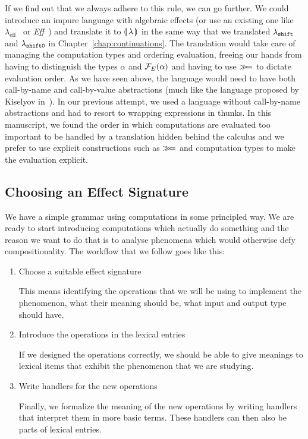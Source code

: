 If we find out that we always adhere to this rule, we can go further. We
could introduce an impure language with algebraic effects (or use an
existing one like $\lambda_{\mathrm{eff}}$~\cite{kammar2013handlers} or
\emph{Eff}~\cite{bauer2012programming}) and translate it to
$\llparenthesis \, \lambda \, \rrparenthesis$ in the same way that we translated $\lambda_{\mathtt{shift}}$ and
$\lambda_{\mathtt{shift0}}$ in Chapter~\ref{chap:continuations}. The translation
would take care of managing the computation types and ordering evaluation,
freeing our hands from having to distinguish the types $\alpha$ and
$\mathcal{F}_E(\alpha)$ and having to use $\mathbin{\gg\!=}$ to dictate evaluation order. As
we have seen above, the language would need to have both call-by-name and
call-by-value abstractions (much like the language proposed by Kiselyov
in~\cite{kiselyov2008call}). In our previous attempt, we used a language
without call-by-name abstractions and had to resort to wrapping expressions
in thunks. In this manuscript, we found the order in which computations are
evaluated too important to be handled by a translation hidden behind the
calculus and we prefer to use explicit constructions such as $\mathbin{\gg\!=}$ and
computation types to make the evaluation explicit.


\subsection{Choosing an Effect Signature}
\label{ssec:choosing-effect-signature}

We have a simple grammar using computations in some principled way. We are
ready to start introducing computations which actually do something and the
reason we want to do that is to analyse phenomena which would otherwise
defy compositionality. The workflow that we follow goes like this:

\begin{enumerate}
\item Choose a suitable effect signature

  This means identifying the operations that we will be using to implement
  the phenomenon, what their meaning should be, what input and output type
  should have.
  
\item Introduce the operations in the lexical entries
  
  If we designed the operations correctly, we should be able to give
  meanings to lexical items that exhibit the phenomenon that we are
  studying.
  
\item Write handlers for the new operations
  
  Finally, we formalize the meaning of the new operations by writing
  handlers that interpret them in more basic terms. These handlers can then
  also be parts of lexical entries.
\end{enumerate}

